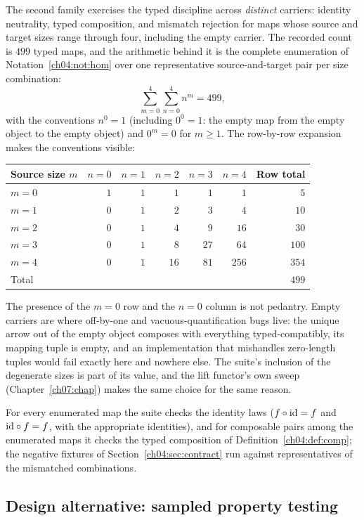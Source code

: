 The second family exercises the typed discipline across \emph{distinct}
carriers: identity neutrality, typed composition, and mismatch rejection for
maps whose source and target sizes range through four, including the empty
carrier. The recorded count is $499$ typed maps, and the arithmetic behind
it is the complete enumeration of Notation~\ref{ch04:not:hom} over one
representative source-and-target pair per size combination:
\[
  \sum_{m=0}^{4} \sum_{n=0}^{4} n^{m} = 499,
\]
with the conventions $n^{0} = 1$ (including $0^{0} = 1$: the empty map from
the empty object to the empty object) and $0^{m} = 0$ for $m \ge 1$.
The row-by-row expansion makes the conventions visible:
\begin{center}
\begin{tabular}{@{}lrrrrrr@{}}
\toprule
Source size $m$ & $n{=}0$ & $n{=}1$ & $n{=}2$ & $n{=}3$ & $n{=}4$ & Row total \\
\midrule
$m = 0$ & $1$ & $1$ & $1$ & $1$ & $1$ & $5$ \\
$m = 1$ & $0$ & $1$ & $2$ & $3$ & $4$ & $10$ \\
$m = 2$ & $0$ & $1$ & $4$ & $9$ & $16$ & $30$ \\
$m = 3$ & $0$ & $1$ & $8$ & $27$ & $64$ & $100$ \\
$m = 4$ & $0$ & $1$ & $16$ & $81$ & $256$ & $354$ \\
\midrule
Total & & & & & & $499$ \\
\bottomrule
\end{tabular}
\end{center}
The presence of the $m = 0$ row and the $n = 0$ column is not pedantry.
Empty carriers are where off-by-one and vacuous-quantification bugs live:
the unique arrow out of the empty object composes with everything
typed-compatibly, its mapping tuple is empty, and an implementation that
mishandles zero-length tuples would fail exactly here and nowhere else. The
suite's inclusion of the degenerate sizes is part of its value, and the lift
functor's own sweep (Chapter~\ref{ch07:chap}) makes the same choice for the
same reason.

For every enumerated map the suite checks the identity laws
($f \circ \mathrm{id} = f$ and $\mathrm{id} \circ f = f$, with the appropriate identities),
and for composable pairs among the enumerated maps it checks the typed
composition of Definition~\ref{ch04:def:comp}; the negative fixtures of
Section~\ref{ch04:sec:contract} run against representatives of the
mismatched combinations.

\subsection{Design alternative: sampled property testing}
\label{ch04:sec:sampled}

